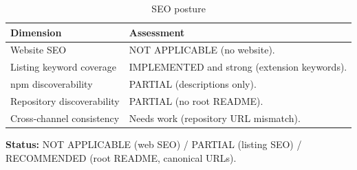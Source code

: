 \begin{table}[H]
\centering
\caption{SEO posture}
\begin{tabular}{@{}L{4.6cm}L{9.6cm}@{}}
\toprule
\textbf{Dimension} & \textbf{Assessment} \\
\midrule
Website SEO & NOT APPLICABLE (no website). \\
Listing keyword coverage & IMPLEMENTED and strong (extension keywords). \\
npm discoverability & PARTIAL (descriptions only). \\
Repository discoverability & PARTIAL (no root README). \\
Cross-channel consistency & Needs work (repository URL mismatch). \\
\bottomrule
\end{tabular}
\end{table}

\textbf{Status:} NOT APPLICABLE (web SEO) / PARTIAL (listing SEO) / RECOMMENDED
(root README, canonical URLs).
